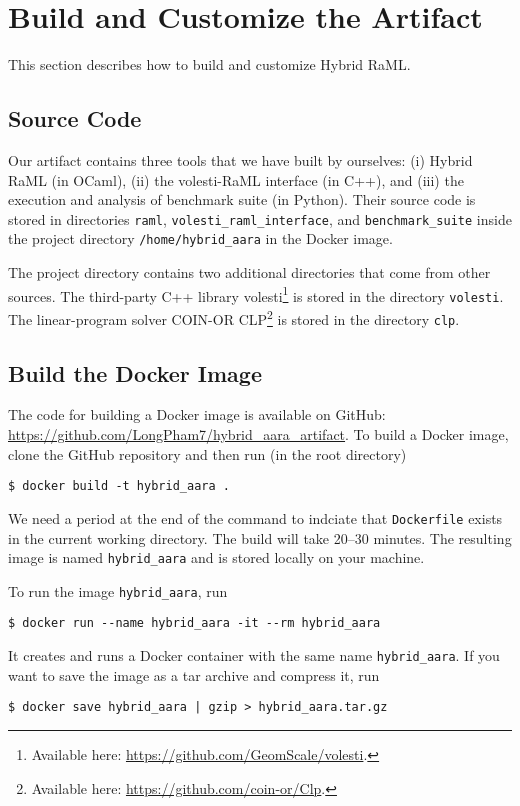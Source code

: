 
\section{Build and Customize the Artifact}

This section describes how to build and customize Hybrid RaML.

\subsection{Source Code}
\label{sec:Source Code}

Our artifact contains three tools that we have built by ourselves: (i) Hybrid
RaML (in OCaml), (ii) the volesti-RaML interface (in C++), and (iii) the
execution and analysis of benchmark suite (in Python).
%
Their source code is stored in directories \texttt{raml},
\texttt{volesti\_raml\_interface}, and \texttt{benchmark\_suite} inside the
project directory \texttt{/home/hybrid\_aara} in the Docker image.

The project directory contains two additional directories that come from other
sources.
%
The third-party C++ library volesti\footnote{Available here:
  \url{https://github.com/GeomScale/volesti}.} is stored in the directory
\texttt{volesti}.
%
The linear-program solver COIN-OR CLP\footnote{Available here:
  \url{https://github.com/coin-or/Clp}.} is stored in the directory \texttt{clp}.

\subsection{Build the Docker Image}
\label{sec:Build the Docker Image}

The code for building a Docker image is available on GitHub:
\url{https://github.com/LongPham7/hybrid_aara_artifact}.
%
To build a Docker image, clone the GitHub repository and then run (in the root
directory)
\begin{verbatim}
$ docker build -t hybrid_aara .
\end{verbatim}
%
We need a period at the end of the command to indciate that \texttt{Dockerfile}
exists in the current working directory.
%
The build will take 20--30 minutes.
%
The resulting image is named \texttt{hybrid\_aara} and is stored locally on your
machine.

To run the image \texttt{hybrid\_aara}, run
\begin{verbatim}
$ docker run --name hybrid_aara -it --rm hybrid_aara
\end{verbatim}
%
It creates and runs a Docker container with the same name \texttt{hybrid\_aara}.
%
If you want to save the image as a tar archive and compress it, run
\begin{verbatim}
$ docker save hybrid_aara | gzip > hybrid_aara.tar.gz
\end{verbatim}

